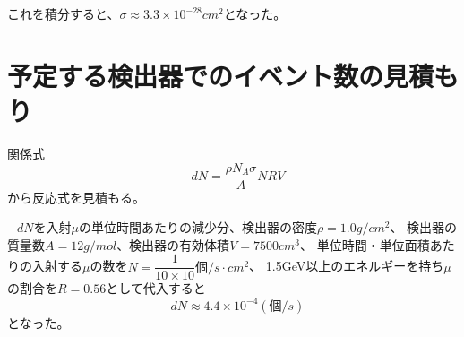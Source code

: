これを積分すると、$\sigma \approx 3.3 \times 10^{-28} cm^2$となった。

\section{予定する検出器でのイベント数の見積もり}
関係式
\begin{equation}
    -dN =\dfrac{\rho N_A \sigma }{A}NRV
\end{equation}
から反応式を見積もる。

$-dN$を入射$\mu$の単位時間あたりの減少分、検出器の密度$\rho = 1.0 g/cm^2$、
検出器の質量数$A = 12 g/mol$、検出器の有効体積$V = 7500cm^3$、
単位時間・単位面積あたりの入射する$\mu$の数を$N = \dfrac{1}{10\times 10} 個/s\cdot cm^2$、
1.5GeV以上のエネルギーを持ち$\mu$の割合を$R = 0.56$として代入すると
\begin{equation}
    -dN \approx 4.4 \times 10^{-4}(個/s)
\end{equation}
となった。
